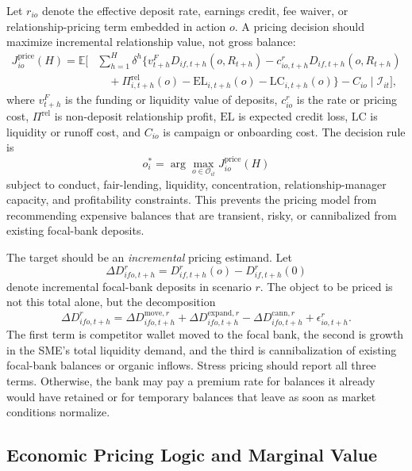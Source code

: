 \documentclass[11pt]{article}
\begin{document}
Let $r_{io}$ denote the effective deposit rate, earnings credit, fee waiver, or
relationship-pricing term embedded in action $o$. A pricing decision should
maximize incremental relationship value, not gross balance:
\[
\begin{aligned}
  J_{io}^{\mathrm{price}}(H)
  =
  \mathbb{E}\Big[
  &\sum_{h=1}^{H}
    \delta^h
    \{v_{t+h}^{F}D_{if,t+h}(o,R_{t+h})
    - c^{r}_{io,t+h}D_{if,t+h}(o,R_{t+h}) \\
  &\quad
    + \Pi_{i,t+h}^{\mathrm{rel}}(o)
    - \mathrm{EL}_{i,t+h}(o)
    - \mathrm{LC}_{i,t+h}(o)\}
    - C_{io}
  \mid \mathcal{I}_{it}\Big],
\end{aligned}
\]
where $v_{t+h}^{F}$ is the funding or liquidity value of deposits, $c^{r}_{io}$
is the rate or pricing cost, $\Pi^{\mathrm{rel}}$ is non-deposit relationship
profit, $\mathrm{EL}$ is expected credit loss, $\mathrm{LC}$ is liquidity or
runoff cost, and $C_{io}$ is campaign or onboarding cost. The decision rule is
\[
  o_i^{*}
  =
  \arg\max_{o\in\mathcal{O}_{it}}
  J_{io}^{\mathrm{price}}(H)
\]
subject to conduct, fair-lending, liquidity, concentration, relationship-manager
capacity, and profitability constraints. This prevents the pricing model from
recommending expensive balances that are transient, risky, or cannibalized from
existing focal-bank deposits.

The target should be an \emph{incremental} pricing estimand. Let
\[
  \Delta D_{ifo,t+h}^{r}
  =
  D_{if,t+h}^{r}(o)-D_{if,t+h}^{r}(0)
\]
denote incremental focal-bank deposits in scenario $r$. The object to be priced
is not this total alone, but the decomposition
\[
  \Delta D_{ifo,t+h}^{r}
  =
  \Delta D_{ifo,t+h}^{\mathrm{move},r}
  +\Delta D_{ifo,t+h}^{\mathrm{expand},r}
  -\Delta D_{ifo,t+h}^{\mathrm{cann},r}
  +\epsilon_{io,t+h}^{r}.
\]
The first term is competitor wallet moved to the focal bank, the second is
growth in the SME's total liquidity demand, and the third is cannibalization of
existing focal-bank balances or organic inflows. Stress pricing should report
all three terms. Otherwise, the bank may pay a premium rate for balances it
already would have retained or for temporary balances that leave as soon as
market conditions normalize.

\subsection{Economic Pricing Logic and Marginal Value}
\end{document}
